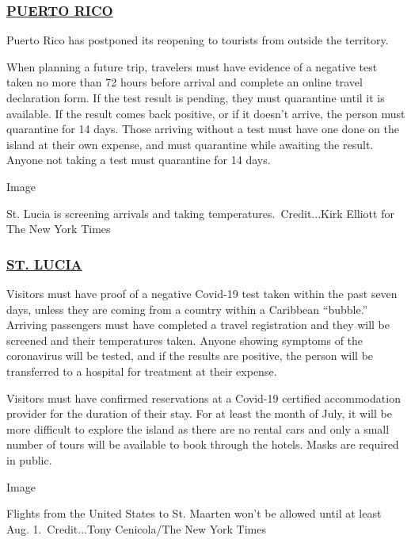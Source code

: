 \hypertarget{puerto-rico}{%
\subsubsection{\texorpdfstring{\href{https://www.discoverpuertorico.com/info/travel-advisory}{PUERTO
RICO}}{PUERTO RICO}}\label{puerto-rico}}

Puerto Rico has postponed its reopening to tourists from outside the
territory.

When planning a future trip, travelers must have evidence of a negative
test taken no more than 72 hours before arrival and complete an online
travel declaration form. If the test result is pending, they must
quarantine until it is available. If the result comes back positive, or
if it doesn't arrive, the person must quarantine for 14 days. Those
arriving without a test must have one done on the island at their own
expense, and must quarantine while awaiting the result. Anyone not
taking a test must quarantine for 14 days.

Image

St. Lucia is screening arrivals and taking temperatures.~Credit...Kirk
Elliott for The New York Times

\hypertarget{st-lucia}{%
\subsubsection{\texorpdfstring{\href{https://www.stlucia.org/en/covid-19/}{ST.
LUCIA}}{ST. LUCIA}}\label{st-lucia}}

Visitors must have proof of a negative Covid-19 test taken within the
past seven days, unless they are coming from a country within a
Caribbean ``bubble.'' Arriving passengers must have completed a travel
registration and they will be screened and their temperatures taken.
Anyone showing symptoms of the coronavirus will be tested, and if the
results are positive, the person will be transferred to a hospital for
treatment at their expense.

Visitors must have confirmed reservations at a Covid-19 certified
accommodation provider for the duration of their stay. For at least the
month of July, it will be more difficult to explore the island as there
are no rental cars and only a small number of tours will be available to
book through the hotels. Masks are required in public.

Image

Flights from the United States to St. Maarten won't be allowed until at
least Aug. 1.~Credit...Tony Cenicola/The New York Times

